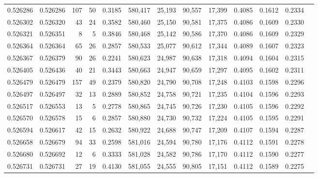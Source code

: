 \begin{tabular}{rrrrrrrrrrrrr}
0.526286 & 0.526286 &   107 &    50 &                                     0.3185 & 580,417 &  25,193 &  90,557 &  17,399 & 0.4085 & 0.1612 & 0.2334 \\
0.526302 & 0.526320 &    43 &    24 &                                     0.3582 & 580,460 &  25,150 &  90,581 &  17,375 & 0.4086 & 0.1609 & 0.2330 \\
0.526321 & 0.526351 &     8 &     5 &                                     0.3846 & 580,468 &  25,142 &  90,586 &  17,370 & 0.4086 & 0.1609 & 0.2329 \\
0.526364 & 0.526364 &    65 &    26 &                                     0.2857 & 580,533 &  25,077 &  90,612 &  17,344 & 0.4089 & 0.1607 & 0.2323 \\
0.526367 & 0.526379 &    90 &    26 &                                     0.2241 & 580,623 &  24,987 &  90,638 &  17,318 & 0.4094 & 0.1604 & 0.2315 \\
0.526405 & 0.526436 &    40 &    21 &                                     0.3443 & 580,663 &  24,947 &  90,659 &  17,297 & 0.4095 & 0.1602 & 0.2311 \\
0.526479 & 0.526479 &   157 &    49 &                                     0.2379 & 580,820 &  24,790 &  90,708 &  17,248 & 0.4103 & 0.1598 & 0.2296 \\
0.526497 & 0.526497 &    32 &    13 &                                     0.2889 & 580,852 &  24,758 &  90,721 &  17,235 & 0.4104 & 0.1596 & 0.2293 \\
0.526517 & 0.526553 &    13 &     5 &                                     0.2778 & 580,865 &  24,745 &  90,726 &  17,230 & 0.4105 & 0.1596 & 0.2292 \\
0.526570 & 0.526578 &    15 &     6 &                                     0.2857 & 580,880 &  24,730 &  90,732 &  17,224 & 0.4105 & 0.1595 & 0.2291 \\
0.526594 & 0.526617 &    42 &    15 &                                     0.2632 & 580,922 &  24,688 &  90,747 &  17,209 & 0.4107 & 0.1594 & 0.2287 \\
0.526658 & 0.526679 &    94 &    33 &                                     0.2598 & 581,016 &  24,594 &  90,780 &  17,176 & 0.4112 & 0.1591 & 0.2278 \\
0.526680 & 0.526692 &    12 &     6 &                                     0.3333 & 581,028 &  24,582 &  90,786 &  17,170 & 0.4112 & 0.1590 & 0.2277 \\
0.526731 & 0.526731 &    27 &    19 &                                     0.4130 & 581,055 &  24,555 &  90,805 &  17,151 & 0.4112 & 0.1589 & 0.2275 \\

\end{tabular}
